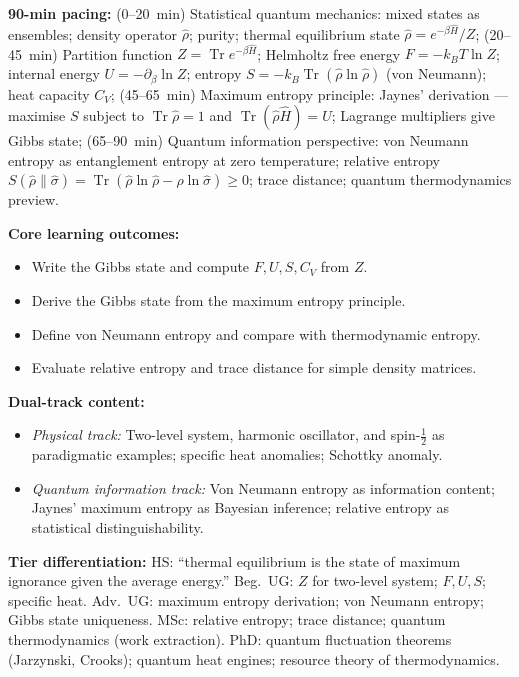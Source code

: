 \documentclass[11pt,a4paper]{article}
\begin{document}
\begin{tcolorbox}[modulebox, title={Module~II.7 --- Lecture L01: Density Operators in Thermodynamics}]
\textbf{90-min pacing:} (0--20~min) Statistical quantum mechanics: mixed states as ensembles; density operator $\hat\rho$; purity; thermal equilibrium state $\hat\rho=e^{-\beta\hat{H}}/Z$; (20--45~min) Partition function $Z=\operatorname{Tr}e^{-\beta\hat{H}}$; Helmholtz free energy $F=-k_BT\ln Z$; internal energy $U=-\partial_\beta\ln Z$; entropy $S=-k_B\operatorname{Tr}(\hat\rho\ln\hat\rho)$ (von Neumann); heat capacity $C_V$; (45--65~min) Maximum entropy principle: Jaynes' derivation --- maximise $S$ subject to $\operatorname{Tr}\hat\rho=1$ and $\operatorname{Tr}(\hat\rho\hat{H})=U$; Lagrange multipliers give Gibbs state; (65--90~min) Quantum information perspective: von Neumann entropy as entanglement entropy at zero temperature; relative entropy $S(\hat\rho\|\hat\sigma)=\operatorname{Tr}(\hat\rho\ln\hat\rho-\hat\rho\ln\hat\sigma)\geq 0$; trace distance; quantum thermodynamics preview.

\medskip\textbf{Core learning outcomes:}
\begin{itemize}[leftmargin=1.4em,topsep=2pt,itemsep=1pt]
  \item Write the Gibbs state and compute $F,U,S,C_V$ from $Z$.
  \item Derive the Gibbs state from the maximum entropy principle.
  \item Define von Neumann entropy and compare with thermodynamic entropy.
  \item Evaluate relative entropy and trace distance for simple density matrices.
\end{itemize}

\medskip\textbf{Dual-track content:}
\begin{itemize}[leftmargin=1.4em,topsep=2pt,itemsep=1pt]
  \item \textit{Physical track:} Two-level system, harmonic oscillator, and spin-$\tfrac{1}{2}$ as paradigmatic examples; specific heat anomalies; Schottky anomaly.
  \item \textit{Quantum information track:} Von Neumann entropy as information content; Jaynes' maximum entropy as Bayesian inference; relative entropy as statistical distinguishability.
\end{itemize}

\medskip\textbf{Tier differentiation:}
HS: ``thermal equilibrium is the state of maximum ignorance given the average energy.''
Beg.\ UG: $Z$ for two-level system; $F,U,S$; specific heat.
Adv.\ UG: maximum entropy derivation; von Neumann entropy; Gibbs state uniqueness.
MSc: relative entropy; trace distance; quantum thermodynamics (work extraction).
PhD: quantum fluctuation theorems (Jarzynski, Crooks); quantum heat engines; resource theory of thermodynamics.


\end{tcolorbox}
\end{document}
